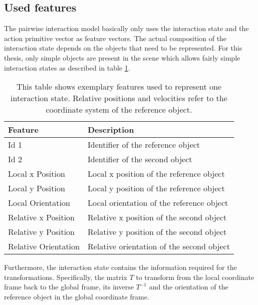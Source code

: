 

\subsection{Used features \label{sec:intFeatures}}

The pairwise interaction model basically only uses the interaction state and the action primitive vector as feature vectors. The actual composition of the interaction state depends on the objects that need to be represented. For this thesis, only simple objects are present in the scene which allows fairly simple interaction states as described in table \ref{tab:pairInteractionFeatures}.

\begin{table}
	\centering
	\begin{tabular*}{\textwidth}{@{\extracolsep{\fill} } l l}
		\textbf{Feature} & \textbf{Description} \\ 
		\hline \hline 
		 Id 1 & Identifier of the reference object \\ 
		 Id 2 & Identifier of the second object \\ 
		 Local x Position & Local x position of the reference object \\
		 Local y Position & Local y position of the reference object \\
		 Local Orientation & Local orientation of the reference object \\
		 Relative x Position & Relative x position of the second object \\
		 Relative y Position & Relative y position of the second object \\
		 Relative Orientation & Relative orientation of the second object \\
		\hline 
	\end{tabular*} 
	\caption{This table shows exemplary features used to represent one interaction state. Relative positions and velocities refer to the coordinate system of the reference object.}
	\label{tab:pairInteractionFeatures}
\end{table}

Furthermore, the interaction state contains the information required for the transformations. Specifically, the matrix $T$ to transform from the local coordinate frame back to the global 
frame, its inverse $T^{-1}$ and the orientation of the reference object in the global coordinate frame.

